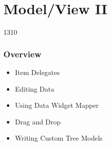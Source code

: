 %
%
%
%

\section{Model/View II}

\begin{slide}{1310}
 \frametitle{Overview}
  
  \begin{itemize}
  \item Item Delegates
  \item Editing Data
  \item Using Data Widget Mapper
  \item Drag and Drop
  \item Writing Custom Tree Models
  \end{itemize}
\end{slide}

% 
% 
% 
% 
%
%




